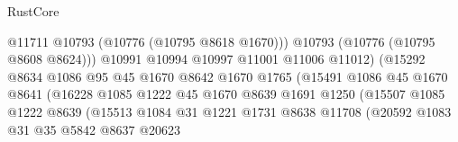 \begin{lexlean}{RustCore}
\begin{coremodule}
                                            @11711
                                            @10793
                                            (@10776 (@10795 @8618 @1670)))
                                          @10793
                                          (@10776 (@10795 @8608 @8624)))
                                        @10991
                                        @10994
                                        @10997
                                        @11001
                                        @11006
                                        @11012)
                                      (@15292
                                        @8634
                                        @1086
                                        @95
                                        @45
                                        @1670
                                        @8642
                                        @1670
                                        @1765
                                        (@15491
                                          @1086
                                          @45
                                          @1670
                                          @8641
                                          (@16228
                                            @1085
                                            @1222
                                            @45
                                            @1670
                                            @8639
                                            @1691
                                            @1250
                                            (@15507
                                              @1085
                                              @1222
                                              @8639
                                              (@15513
                                                @1084
                                                @31
                                                @1221
                                                @1731
                                                @8638
                                                @11708
                                                (@20592
                                                  @1083
                                                  @31
                                                  @35
                                                  @5842
                                                  @8637
                                                  @20623

\end{coremodule}
\end{lexlean}
